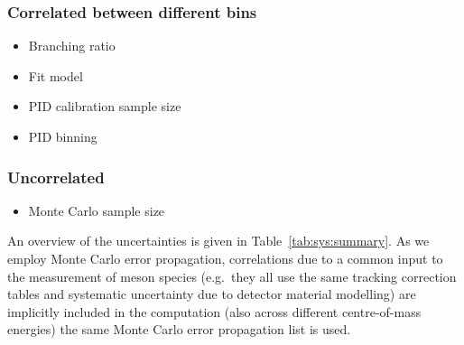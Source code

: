 \subsubsection*{Correlated between different bins}
\begin{itemize}
  \item Branching ratio
  \item Fit model
  \item \ac{PID} calibration sample size
  \item \ac{PID} binning
\end{itemize}
\subsubsection*{Uncorrelated}
\begin{itemize}
  \item Monte Carlo sample size
\end{itemize}
An overview of the uncertainties is given in Table~\ref{tab:sys:summary}. As we 
employ Monte Carlo
error propagation, correlations due to a common input to the measurement of 
meson species (e.g.\ they all use the same tracking correction tables and 
systematic uncertainty due to detector material modelling) are implicitly 
included in the computation (also across different centre-of-mass energies) the 
same Monte Carlo error propagation list is used.
% 


